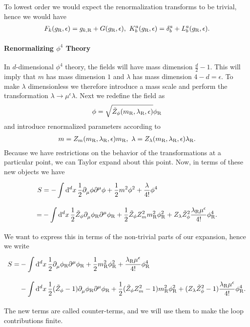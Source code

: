 To lowest order we would expect the renormalization transforms to be trivial, hence we would have
\begin{align*}
	F_{k}(g_{\ren}, \epsilon) = g_{k, \ren} + G(g_{\ren}, \epsilon),\ K^{a}_{b}(g_{\ren}, \epsilon) = \kdelta{a}{b} + L^{a}_{b}(g_{\ren}, \epsilon).
\end{align*}

\paragraph{Renormalizing $\phi^{4}$ Theory}
In $d$-dimensional $\phi^{4}$ theory, the fields will have mass dimension $\frac{d}{2} - 1$. This will imply that $m$ has mass dimension $1$ and $\lambda$ has mass dimension $4 - d = \epsilon$. To make $\lambda$ dimensionless we therefore introduce a mass scale and perform the transformation $\lambda\to\mu^{\epsilon}\lambda$. Next we redefine the field as
\begin{align*}
	\phi = \sqrt{\tilde{Z}_{\phi}(m_{\text{R}}, \lambda_{\text{R}}, \epsilon)}\phi_{\text{R}}
\end{align*}
and introduce renormalized parameters according to
\begin{align*}
	m = Z_{m}(m_{\text{R}}, \lambda_{\text{R}}, \epsilon)m_{\text{R}},\ \lambda = Z_{\lambda}(m_{\text{R}}, \lambda_{\text{R}}, \epsilon)\lambda_{\text{R}}.
\end{align*}
Because we have restrictions on the behavior of the transformations at a particular point, we can Taylor expand about this point. Now, in terms of these new objects we have
\begin{align*}
	S &= -\int\limits_{}^{}\dd[d]{x}\frac{1}{2}\partial^{}_{\mu}\phi\partial^{\mu}_{}\phi + \frac{1}{2}m^{2}\phi^{2} + \frac{\lambda}{4!}\phi^{4} \\
	  =& -\int\limits_{}^{}\dd[d]{x}\frac{1}{2}\tilde{Z}_{\phi}\partial^{}_{\mu}\phi_{\text{R}}\partial^{\mu}_{}\phi_{\text{R}} + \frac{1}{2}\tilde{Z}_{\phi}Z_{m}^{2}m_{\text{R}}^{2}\phi_{\text{R}}^{2} + Z_{\lambda}\tilde{Z}_{\phi}^{2}\frac{\lambda_{\text{R}}\mu^{\epsilon}}{4!}\phi_{\text{R}}^{4}.
\end{align*}
We want to express this in terms of the non-trivial parts of our expansion, hence we write
\begin{align*}
	S =& -\int\limits_{}^{}\dd[d]{x}\frac{1}{2}\partial^{}_{\mu}\phi_{\text{R}}\partial^{\mu}_{}\phi_{\text{R}} + \frac{1}{2}m_{\text{R}}^{2}\phi_{\text{R}}^{2} + \frac{\lambda_{\text{R}}\mu^{\epsilon}}{4!}\phi_{\text{R}}^{4} \\
	   &- \int\limits_{}^{}\dd[d]{x}\frac{1}{2}(\tilde{Z}_{\phi} - 1)\partial^{}_{\mu}\phi_{\text{R}}\partial^{\mu}_{}\phi_{\text{R}} + \frac{1}{2}(\tilde{Z}_{\phi}Z_{m}^{2} - 1)m_{\text{R}}^{2}\phi_{\text{R}}^{2} + (Z_{\lambda}\tilde{Z}_{\phi}^{2} - 1)\frac{\lambda_{\text{R}}\mu^{\epsilon}}{4!}\phi_{\text{R}}^{4}.
\end{align*}
The new terms are called counter-terms, and we will use them to make the loop contributions finite.

